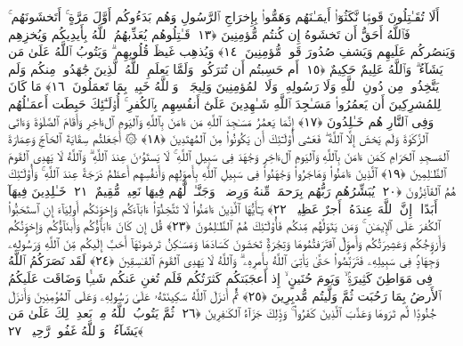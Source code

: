  أَلَا تُقَـٰتِلُونَ قَومًۭا نَّكَثُوٓا۟ أَيمَـٰنَهُم وَهَمُّوا۟ بِإِخرَاجِ ٱلرَّسُولِ وَهُم بَدَءُوكُم أَوَّلَ مَرَّةٍ ۚ أَتَخشَونَهُم ۚ فَٱللَّهُ أَحَقُّ أَن تَخشَوهُ إِن كُنتُم مُّؤمِنِينَ ﴿١٣﴾
 قَـٰتِلُوهُم يُعَذِّبهُمُ ٱللَّهُ بِأَيدِيكُم وَيُخزِهِم وَيَنصُركُم عَلَيهِم وَيَشفِ صُدُورَ قَومٍۢ مُّؤمِنِينَ ﴿١٤﴾
 وَيُذهِب غَيظَ قُلُوبِهِم ۗ وَيَتُوبُ ٱللَّهُ عَلَىٰ مَن يَشَآءُ ۗ وَٱللَّهُ عَلِيمٌ حَكِيمٌ ﴿١٥﴾
 أَم حَسِبتُم أَن تُترَكُوا۟ وَلَمَّا يَعلَمِ ٱللَّهُ ٱلَّذِينَ جَٰهَدُوا۟ مِنكُم وَلَم يَتَّخِذُوا۟ مِن دُونِ ٱللَّهِ وَلَا رَسُولِهِۦ وَلَا ٱلمُؤمِنِينَ وَلِيجَةًۭ ۚ وَٱللَّهُ خَبِيرٌۢ بِمَا تَعمَلُونَ ﴿١٦﴾
 مَا كَانَ لِلمُشرِكِينَ أَن يَعمُرُوا۟ مَسَـٰجِدَ ٱللَّهِ شَـٰهِدِينَ عَلَىٰٓ أَنفُسِهِم بِٱلكُفرِ ۚ أُو۟لَـٰٓئِكَ حَبِطَت أَعمَـٰلُهُم وَفِى ٱلنَّارِ هُم خَـٰلِدُونَ ﴿١٧﴾
 إِنَّمَا يَعمُرُ مَسَـٰجِدَ ٱللَّهِ مَن ءَامَنَ بِٱللَّهِ وَٱليَومِ ٱلءَاخِرِ وَأَقَامَ ٱلصَّلَوٰةَ وَءَاتَى ٱلزَّكَوٰةَ وَلَم يَخشَ إِلَّا ٱللَّهَ ۖ فَعَسَىٰٓ أُو۟لَـٰٓئِكَ أَن يَكُونُوا۟ مِنَ ٱلمُهتَدِينَ ﴿١٨﴾
 ۞ أَجَعَلتُم سِقَايَةَ ٱلحَآجِّ وَعِمَارَةَ ٱلمَسجِدِ ٱلحَرَامِ كَمَن ءَامَنَ بِٱللَّهِ وَٱليَومِ ٱلءَاخِرِ وَجَٰهَدَ فِى سَبِيلِ ٱللَّهِ ۚ لَا يَستَوُۥنَ عِندَ ٱللَّهِ ۗ وَٱللَّهُ لَا يَهدِى ٱلقَومَ ٱلظَّـٰلِمِينَ ﴿١٩﴾
 ٱلَّذِينَ ءَامَنُوا۟ وَهَاجَرُوا۟ وَجَٰهَدُوا۟ فِى سَبِيلِ ٱللَّهِ بِأَموَٟلِهِم وَأَنفُسِهِم أَعظَمُ دَرَجَةً عِندَ ٱللَّهِ ۚ وَأُو۟لَـٰٓئِكَ هُمُ ٱلفَآئِزُونَ ﴿٢٠﴾
 يُبَشِّرُهُم رَبُّهُم بِرَحمَةٍۢ مِّنهُ وَرِضوَٟنٍۢ وَجَنَّـٰتٍۢ لَّهُم فِيهَا نَعِيمٌۭ مُّقِيمٌ ﴿٢١﴾
 خَـٰلِدِينَ فِيهَآ أَبَدًا ۚ إِنَّ ٱللَّهَ عِندَهُۥٓ أَجرٌ عَظِيمٌۭ ﴿٢٢﴾
 يَـٰٓأَيُّهَا ٱلَّذِينَ ءَامَنُوا۟ لَا تَتَّخِذُوٓا۟ ءَابَآءَكُم وَإِخوَٟنَكُم أَولِيَآءَ إِنِ ٱستَحَبُّوا۟ ٱلكُفرَ عَلَى ٱلإِيمَـٰنِ ۚ وَمَن يَتَوَلَّهُم مِّنكُم فَأُو۟لَـٰٓئِكَ هُمُ ٱلظَّـٰلِمُونَ ﴿٢٣﴾
 قُل إِن كَانَ ءَابَآؤُكُم وَأَبنَآؤُكُم وَإِخوَٟنُكُم وَأَزوَٟجُكُم وَعَشِيرَتُكُم وَأَموَٟلٌ ٱقتَرَفتُمُوهَا وَتِجَٰرَةٌۭ تَخشَونَ كَسَادَهَا وَمَسَـٰكِنُ تَرضَونَهَآ أَحَبَّ إِلَيكُم مِّنَ ٱللَّهِ وَرَسُولِهِۦ وَجِهَادٍۢ فِى سَبِيلِهِۦ فَتَرَبَّصُوا۟ حَتَّىٰ يَأتِىَ ٱللَّهُ بِأَمرِهِۦ ۗ وَٱللَّهُ لَا يَهدِى ٱلقَومَ ٱلفَـٰسِقِينَ ﴿٢٤﴾
 لَقَد نَصَرَكُمُ ٱللَّهُ فِى مَوَاطِنَ كَثِيرَةٍۢ ۙ وَيَومَ حُنَينٍ ۙ إِذ أَعجَبَتكُم كَثرَتُكُم فَلَم تُغنِ عَنكُم شَيـًۭٔا وَضَاقَت عَلَيكُمُ ٱلأَرضُ بِمَا رَحُبَت ثُمَّ وَلَّيتُم مُّدبِرِينَ ﴿٢٥﴾
 ثُمَّ أَنزَلَ ٱللَّهُ سَكِينَتَهُۥ عَلَىٰ رَسُولِهِۦ وَعَلَى ٱلمُؤمِنِينَ وَأَنزَلَ جُنُودًۭا لَّم تَرَوهَا وَعَذَّبَ ٱلَّذِينَ كَفَرُوا۟ ۚ وَذَٟلِكَ جَزَآءُ ٱلكَـٰفِرِينَ ﴿٢٦﴾
 ثُمَّ يَتُوبُ ٱللَّهُ مِنۢ بَعدِ ذَٟلِكَ عَلَىٰ مَن يَشَآءُ ۗ وَٱللَّهُ غَفُورٌۭ رَّحِيمٌۭ ﴿٢٧﴾
